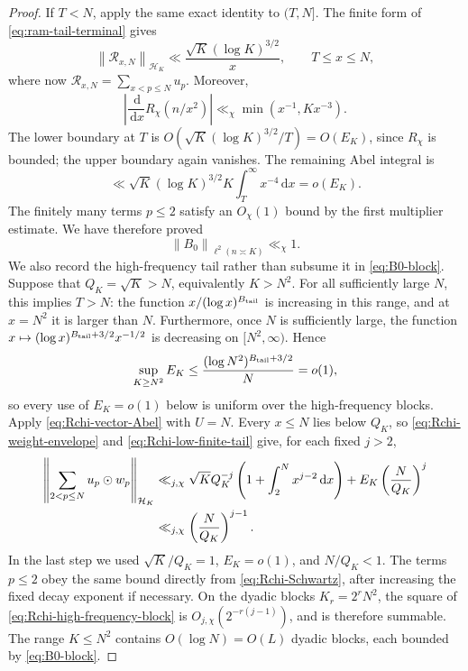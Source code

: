 \documentclass[11pt]{article}
\numberwithin{equation}{section}
\theoremstyle{definition}
\newcommand{\1}{\mathbf 1}
\newcommand{\dd}{\,\mathrm d}
\newcommand{\norm}[1]{\left\lVert#1\right\rVert}
\begin{document}
\begin{proof}
If \(T<N\), apply the same exact identity to \((T,N]\).  The finite
form of \eqref{eq:ram-tail-terminal} gives
\[
 \norm{\mathcal R_{x,N}}_{\mathcal H_K}
 \ll\frac{\sqrt K(\log K)^{3/2}}x,
 \qquad T\le x\le N,
\]
where now \(\mathcal R_{x,N}=\sum_{x<p\le N}u_p\).  Moreover,
\[
 \left|\frac{\dd}{\dd x}R_\chi(n/x^2)\right|
 \ll_\chi\min(x^{-1},Kx^{-3}).
\]
The lower boundary at \(T\) is
\(O(\sqrt K(\log K)^{3/2}/T)=O(E_K)\), since \(R_\chi\) is bounded;
the upper boundary again vanishes.  The remaining Abel integral is
\[
 \ll \sqrt K(\log K)^{3/2}K\int_T^\infty x^{-4}\dd x
 =o(E_K).
\]
The finitely many terms \(p\le2\) satisfy an \(O_\chi(1)\) bound by
the first multiplier estimate.  We have therefore proved
\begin{equation}\label{eq:B0-block}
 \norm{B_0}_{\ell^2(n\asymp K)}\ll_\chi1.
\end{equation}
We also record the high-frequency tail rather than subsume it in
\eqref{eq:B0-block}.  Suppose that \(Q_K=\sqrt K>N\), equivalently
\(K>N^2\).  For all sufficiently large \(N\), this implies \(T>N\):
the function \(x/(\log x)^{B_{\rm tail}}\) is increasing in this range, and at
\(x=N^2\) it is larger than \(N\).
Furthermore, once \(N\) is sufficiently large, the function
\(x\mapsto(\log x)^{B_{\rm tail}+3/2}x^{-1/2}\) is decreasing on
\([N^2,\infty)\).  Hence
\[
 \sup_{K\ge N^2}E_K
 \le \frac{(\log N^2)^{B_{\rm tail}+3/2}}N=o(1),
\]
so every use of \(E_K=o(1)\) below is uniform over the high-frequency
blocks.  Apply
\eqref{eq:Rchi-vector-Abel} with \(U=N\).  Every \(x\le N\) lies below
\(Q_K\), so \eqref{eq:Rchi-weight-envelope} and
\eqref{eq:Rchi-low-finite-tail} give, for each fixed \(j>2\),
\begin{align}
 \left\|\sum_{2<p\le N}u_p\odot w_p\right\|_{\mathcal H_K}
 &\ll_{j,\chi}
 \sqrt K Q_K^{-j}
 \left(1+\int_2^Nx^{j-2}\dd x\right)
 +E_K\left(\frac N{Q_K}\right)^j\notag\\
 &\ll_{j,\chi}
 \left(\frac N{Q_K}\right)^{j-1}.
 \label{eq:Rchi-high-frequency-block}
\end{align}
In the last step we used \(\sqrt K/Q_K=1\),
\(E_K=o(1)\), and \(N/Q_K<1\).  The terms \(p\le2\) obey the same
bound directly from \eqref{eq:Rchi-Schwartz}, after increasing the
fixed decay exponent if necessary.  On the dyadic blocks
\(K_r=2^rN^2\), the square of
\eqref{eq:Rchi-high-frequency-block} is
\(O_{j,\chi}(2^{-r(j-1)})\), and is therefore summable.  The range
\(K\le N^2\) contains \(O(\log N)=O(L)\) dyadic blocks, each bounded
by \eqref{eq:B0-block}.


\end{proof}
\end{document}
